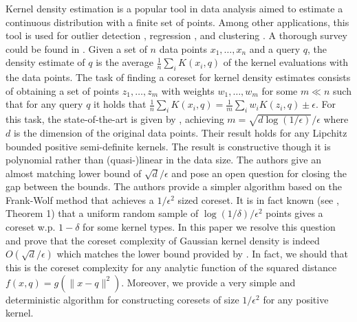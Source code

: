 \documentclass[anon,12pt]{colt2019} %
\newcommand{\eps}{\epsilon}
\begin{document}
Kernel density estimation is a popular tool in data analysis aimed to estimate a continuous distribution with a finite set of points. Among other applications, this tool is used for outlier detection \cite{schubert2014generalized}, regression \cite{fan2018local}, and clustering \cite{rinaldo2010generalized}. A thorough survey could be found in \cite{silverman2018density}. Given a set of $n$ data points $x_1,\ldots,x_n$ and a query $q$, the density estimate of $q$ is the average $\frac{1}{n} \sum_i K(x_i,q)$ of the kernel evaluations with the data points. The task of finding a coreset for kernel density estimates consists of obtaining a set of points $z_1,\ldots,z_m$ with weights $w_1,\ldots,w_m$ for some $m \ll n$ such that for any query $q$ it holds that 
$\frac{1}{n} \sum_i K(x_i,q) = \frac{1}{m} \sum_i w_i K(z_i,q) \pm \eps$. For this task, the state-of-the-art is given by \cite{DBLP:journals/corr/abs-1802-01751}, achieving $m=\sqrt{d\log(1/\eps)}/\eps$ where $d$ is the dimension of the original data points. Their result holds for any Lipchitz bounded positive semi-definite kernels. The result is constructive though it is polynomial rather than (quasi-)linear in the data size. The authors give an almost matching lower bound of $\sqrt{d}/\eps$ and pose an open question for closing the gap between the bounds. The authors provide a simpler algorithm based on the Frank-Wolf method that achieves a $1/\eps^2$ sized coreset. It is in fact known (see \cite{lopez2015towards}, Theorem 1) that a uniform random sample of $\log(1/\delta)/\eps^2$ points gives a coreset w.p. $1-\delta$ for some kernel types. 
In this paper we resolve this question and prove that the coreset complexity of Gaussian kernel density is indeed $O(\sqrt{d}/\eps)$ which matches the lower bound provided by \cite{DBLP:journals/corr/abs-1802-01751}. 
In fact, we should that this is the coreset complexity for any analytic function of the squared distance $f(x,q) = g(\|x-q\|^2)$.
Moreover, we provide a very simple and deterministic algorithm for constructing coresets of size $1/\eps^2$ for any positive kernel.
\end{document}
